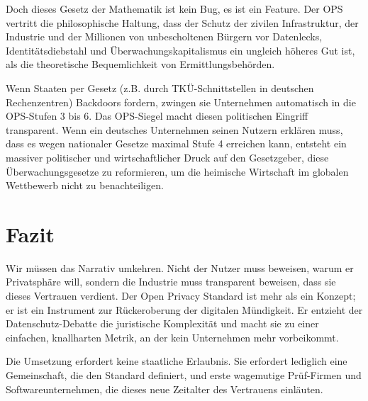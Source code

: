\documentclass[11pt, a4paper]{article}
\begin{document}
	Doch dieses Gesetz der Mathematik ist kein Bug, es ist ein Feature. Der OPS vertritt die philosophische Haltung, dass der Schutz der zivilen Infrastruktur, der Industrie und der Millionen von unbescholtenen Bürgern vor Datenlecks, Identitätsdiebstahl und Überwachungskapitalismus ein ungleich höheres Gut ist, als die theoretische Bequemlichkeit von Ermittlungsbehörden. 
	
	Wenn Staaten per Gesetz (z.B. durch TKÜ-Schnittstellen in deutschen Rechenzentren) Backdoors fordern, zwingen sie Unternehmen automatisch in die OPS-Stufen 3 bis 6. Das OPS-Siegel macht diesen politischen Eingriff transparent. Wenn ein deutsches Unternehmen seinen Nutzern erklären muss, dass es wegen nationaler Gesetze maximal Stufe 4 erreichen kann, entsteht ein massiver politischer und wirtschaftlicher Druck auf den Gesetzgeber, diese Überwachungsgesetze zu reformieren, um die heimische Wirtschaft im globalen Wettbewerb nicht zu benachteiligen.
	
	\section{Fazit}
	
	Wir müssen das Narrativ umkehren. Nicht der Nutzer muss beweisen, warum er Privatsphäre will, sondern die Industrie muss transparent beweisen, dass sie dieses Vertrauen verdient. Der Open Privacy Standard ist mehr als ein Konzept; er ist ein Instrument zur Rückeroberung der digitalen Mündigkeit. Er entzieht der Datenschutz-Debatte die juristische Komplexität und macht sie zu einer einfachen, knallharten Metrik, an der kein Unternehmen mehr vorbeikommt. 
	
	Die Umsetzung erfordert keine staatliche Erlaubnis. Sie erfordert lediglich eine Gemeinschaft, die den Standard definiert, und erste wagemutige Prüf-Firmen und Softwareunternehmen, die dieses neue Zeitalter des Vertrauens einläuten.
	
\end{document}
